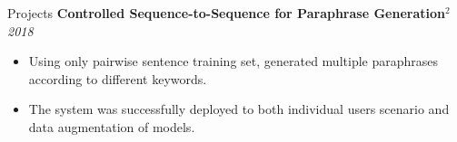 \documentclass{resume} %
\begin{document}
\begin{rSection}{Projects}
{\bf Controlled Sequence-to-Sequence for Paraphrase Generation$^2$} \hfill {\em 2018}
\begin{itemize}
    \item Using only pairwise sentence training set, generated multiple paraphrases according to different keywords. 
    \item The system was successfully deployed to both individual users scenario and data augmentation of models.
\end{itemize}



    

\end{rSection}
\end{document}
